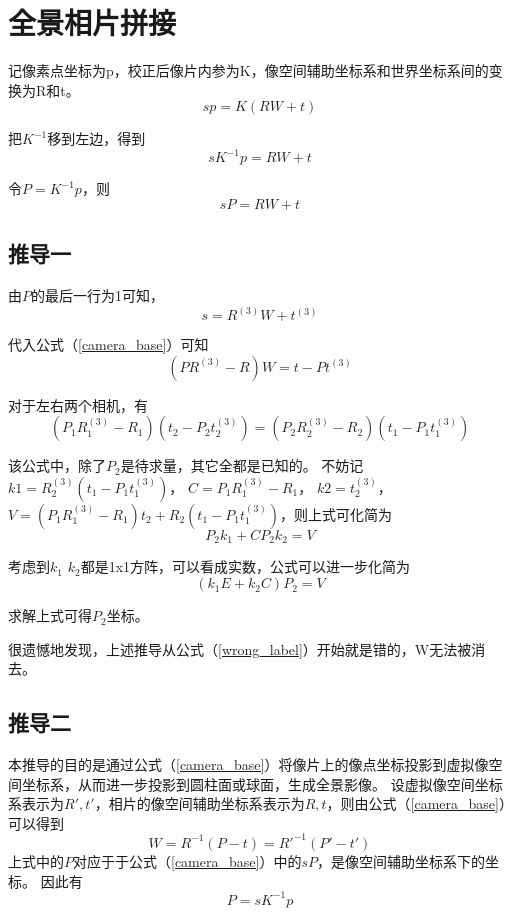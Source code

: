\section{全景相片拼接}
记像素点坐标为p，校正后像片内参为K，像空间辅助坐标系和世界坐标系间的变换为R和t。
\begin{equation}
  sp=K(RW+t)
\end{equation}

把$K^{-1}$移到左边，得到
\begin{equation}
  sK^{-1}p=RW+t
\end{equation}

令$P=K^{-1}p$，则
\begin{equation}
  sP=RW+t \label{camera_base}
\end{equation}

\subsection{推导一}
由$P$的最后一行为1可知，
\begin{equation}
  s=R^{(3)}W+t^{(3)}
\end{equation}

代入公式（\ref{camera_base}）可知
\begin{equation}
  (PR^{(3)}-R)W=t-Pt^{(3)} \label{wrong_label}
\end{equation}

对于左右两个相机，有
\begin{equation}
  (P_1 R_1^{(3)} - R_1)(t_2 - P_2 t_2^{(3)})=
  (P_2 R_2^{(3)} - R_2)(t_1 - P_1 t_1^{(3)})
\end{equation}

该公式中，除了$P_2$是待求量，其它全都是已知的。
不妨记$k1=R_2^{(3)} (t_1 - P_1 t_1^{(3)})$，
$C=P_1 R_1^{(3)} - R_1$，
$k2=t_2^{(3)}$，
$V=(P_1 R_1^{(3)} - R_1)t_2 + R_2(t_1 - P_1 t_1^{(3)})$，则上式可化简为
\begin{equation}
  P_2 k_1 + C P_2 k_2 = V
\end{equation}

考虑到$k_1$ $k_2$都是1x1方阵，可以看成实数，公式可以进一步化简为
\begin{equation}
  (k_1 E + k_2 C ) P_2 = V
\end{equation}

求解上式可得$P_2$坐标。

很遗憾地发现，上述推导从公式（\ref{wrong_label}）开始就是错的，W无法被消去。

\subsection{推导二}
本推导的目的是通过公式（\ref{camera_base}）将像片上的像点坐标投影到虚拟像空间坐标系，从而进一步投影到圆柱面或球面，生成全景影像。
设虚拟像空间坐标系表示为$R',t'$，相片的像空间辅助坐标系表示为$R, t$，则由公式（\ref{camera_base}）可以得到
\begin{equation}
  W = R^{-1} (P - t) = R'^{-1} (P' - t') \label{quanjingpinjie}
\end{equation}
上式中的$P$对应于于公式（\ref{camera_base}）中的$sP$，是像空间辅助坐标系下的坐标。
因此有
\begin{equation}
  P = s K^{-1} p \label{image_to_xyz}
\end{equation}

